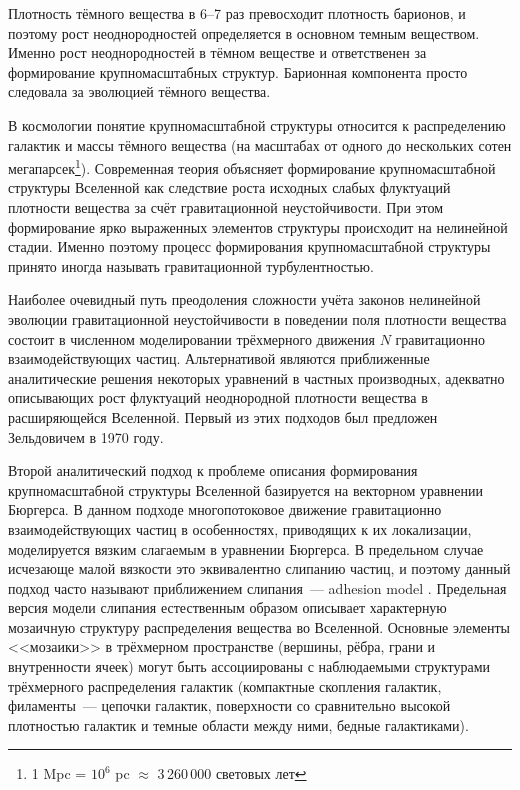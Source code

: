 Плотность тёмного вещества в 6--7 раз превосходит плотность барионов, и поэтому рост неоднородностей определяется в основном темным веществом. Именно рост неоднородностей в тёмном веществе и ответственен за формирование крупномасштабных структур. Барионная компонента просто следовала за эволюцией тёмного вещества.

В космологии понятие крупномасштабной структуры относится к распределению галактик и массы тёмного вещества (на масштабах от одного до нескольких сотен мегапарсек\footnote{1 Mpc = $10^6$ pc $\approx$ 3\,260\,000 световых лет}). Современная теория объясняет формирование крупномасштабной структуры Вселенной как следствие роста исходных слабых флуктуаций плотности вещества за счёт гравитационной неустойчивости. При этом формирование ярко выраженных элементов структуры происходит на нелинейной стадии. Именно поэтому процесс формирования крупномасштабной структуры принято иногда называть гравитационной турбулентностью.

Наиболее очевидный путь преодоления сложности учёта законов нелинейной эволюции гравитационной неустойчивости в поведении поля плотности вещества состоит в численном моделировании трёхмерного движения $N$ гравитационно взаимодействующих частиц. Альтернативой являются приближенные аналитические решения некоторых уравнений в частных производных, адекватно описывающих рост флуктуаций неоднородной плотности вещества в расширяющейся Вселенной. Первый из этих подходов был предложен Зельдовичем в 1970 году.

Второй аналитический подход к проблеме описания формирования крупномасштабной структуры Вселенной \cite{a1} базируется на векторном уравнении Бюргерса. В данном подходе многопотоковое движение гравитационно взаимодействующих частиц в особенностях, приводящих к их локализации, моделируется вязким слагаемым в уравнении Бюргерса. В предельном случае исчезающе малой вязкости это эквивалентно слипанию частиц, и поэтому данный подход часто называют приближением слипания~--- adhesion model \cite{a2,a3,a4,a5}.
Предельная версия модели слипания естественным образом описывает характерную мозаичную структуру распределения вещества во Вселенной. Основные элементы <<мозаики>> в трёхмерном пространстве (вершины, рёбра, грани и внутренности ячеек) могут быть ассоциированы с наблюдаемыми структурами трёхмерного распределения галактик (компактные скопления галактик, филаменты~--- цепочки галактик, поверхности со сравнительно высокой плотностью галактик и темные области между ними, бедные галактиками).

